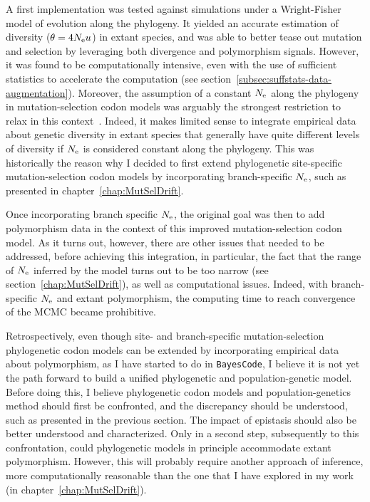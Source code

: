 A first implementation was tested against simulations under a Wright-Fisher model of evolution along the phylogeny.
It yielded an accurate estimation of diversity ($\theta = 4 N_{\text{e}} u$) in extant species, and was able to better tease out mutation and selection by leveraging both divergence and polymorphism signals.
However, it was found to be computationally intensive, even with the use of sufficient statistics to accelerate the computation (see section~\ref{subsec:suffstats-data-augmentation}).
Moreover, the assumption of a constant $N_{\text{e}}$ along the phylogeny in mutation-selection \gls{codon} models was arguably the strongest restriction to relax in this context~\citep{Rousselle2018}.
Indeed, it makes limited sense to integrate empirical data about genetic diversity in extant species that generally have quite different levels of diversity if $N_{\text{e}}$ is considered constant along the phylogeny.
This was historically the reason why I decided to first extend phylogenetic site-specific mutation-selection \gls{codon} models by incorporating branch-specific $N_{\text{e}}$, such as presented in chapter~\ref{chap:MutSelDrift}.

Once incorporating branch specific $N_{\text{e}}$, the original goal was then to add polymorphism data in the context of this improved mutation-selection \gls{codon} model.
As it turns out, however, there are other issues that needed to be addressed, before achieving this integration, in particular, the fact that the range of $N_{\text{e}}$ inferred by the model turns out to be too narrow (see section~\ref{chap:MutSelDrift}), as well as computational issues.
Indeed, with branch-specific $N_{\text{e}}$ and extant polymorphism, the computing time to reach convergence of the \acrshort{MCMC} became prohibitive.

Retrospectively, even though site- and branch-specific mutation-selection phylogenetic \gls{codon} models can be extended by incorporating empirical data about polymorphism, as I have started to do in \texttt{BayesCode}, I believe it is not yet the path forward to build a unified phylogenetic and population-genetic model.
Before doing this, I believe phylogenetic \gls{codon} models and population-genetics method should first be confronted, and the discrepancy should be understood, such as presented in the previous section.
The impact of epistasis should also be better understood and characterized.
Only in a second step, subsequently to this confrontation, could phylogenetic models in principle accommodate extant polymorphism.
However, this will probably require another approach of inference, more computationally reasonable than the one that I have explored in my work (in chapter~\ref{chap:MutSelDrift}).


